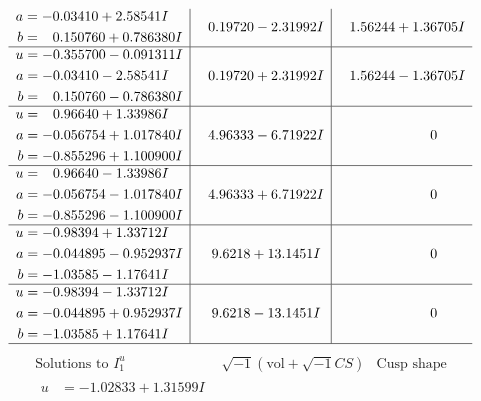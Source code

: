 \documentclass[1p]{elsarticle_modified}
\theoremstyle{definition}
\newcommand{\I}{\sqrt{-1}}
\begin{document}
$$\begin{array}{c|c|c}
\begin{aligned}
a &= -0.03410 + 2.58541 I \\
b &= \phantom{-}0.150760 + 0.786380 I\end{aligned}
 & \phantom{-}0.19720 - 2.31992 I & \phantom{-}1.56244 + 1.36705 I \\ \hline\begin{aligned}
u &= -0.355700 - 0.091311 I \\
a &= -0.03410 - 2.58541 I \\
b &= \phantom{-}0.150760 - 0.786380 I\end{aligned}
 & \phantom{-}0.19720 + 2.31992 I & \phantom{-}1.56244 - 1.36705 I \\ \hline\begin{aligned}
u &= \phantom{-}0.96640 + 1.33986 I \\
a &= -0.056754 + 1.017840 I \\
b &= -0.855296 + 1.100900 I\end{aligned}
 & \phantom{-}4.96333 - 6.71922 I & \phantom{-0.000000 } 0 \\ \hline\begin{aligned}
u &= \phantom{-}0.96640 - 1.33986 I \\
a &= -0.056754 - 1.017840 I \\
b &= -0.855296 - 1.100900 I\end{aligned}
 & \phantom{-}4.96333 + 6.71922 I & \phantom{-0.000000 } 0 \\ \hline\begin{aligned}
u &= -0.98394 + 1.33712 I \\
a &= -0.044895 - 0.952937 I \\
b &= -1.03585 - 1.17641 I\end{aligned}
 & \phantom{-}9.6218 + 13.1451 I & \phantom{-0.000000 } 0 \\ \hline\begin{aligned}
u &= -0.98394 - 1.33712 I \\
a &= -0.044895 + 0.952937 I \\
b &= -1.03585 + 1.17641 I\end{aligned}
 & \phantom{-}9.6218 - 13.1451 I & \phantom{-0.000000 } 0\\
 \hline 
 \end{array}$$\newpage$$\begin{array}{c|c|c}  
\text{Solutions to }I^u_{1}& \I (\text{vol} + \sqrt{-1}CS) & \text{Cusp shape}\\
 \hline 
\begin{aligned}
u &= -1.02833 + 1.31599 I \\

\end{aligned}
\end{array}$$
\end{document}
